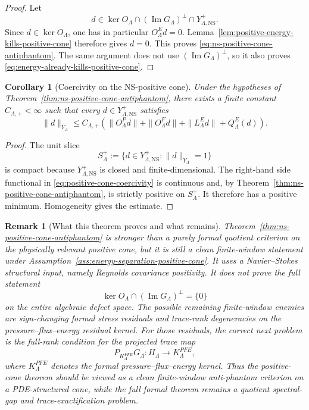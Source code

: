 \documentclass[11pt]{article}
\numberwithin{equation}{section}
\newtheorem{corollary}[theorem]{Corollary}
\newtheorem{remark}[theorem]{Remark}
\newcommand{\NS}{\mathrm{NS}}
\newcommand{\Image}{\operatorname{Im}}
\begin{document}
\begin{proof}
Let
\[
    d\in \ker O_\Lambda
        \cap (\Image G_\Lambda)^\perp
        \cap Y_{\Lambda,\NS}^{+}.
\]
Since \(d\in\ker O_\Lambda\), one has in particular \(O^E_\Lambda d=0\).  Lemma~\ref{lem:positive-energy-kills-positive-cone} therefore gives \(d=0\).  This proves \eqref{eq:ns-positive-cone-antiphantom}.  The same argument does not use \((\Image G_\Lambda)^\perp\), so it also proves \eqref{eq:energy-already-kills-positive-cone}.
\end{proof}

\begin{corollary}[Coercivity on the NS-positive cone]\label{cor:positive-cone-coercivity}
Under the hypotheses of Theorem~\ref{thm:ns-positive-cone-antiphantom}, there exists a finite constant \(C_{\Lambda,+}<\infty\) such that every \(d\in Y_{\Lambda,\NS}^{+}\) satisfies
\begin{equation}\label{eq:positive-cone-coercivity}
    \|d\|_{Y_\Lambda}
    \le
    C_{\Lambda,+}
    \left(
        \|O^P_\Lambda d\|+
        \|O^F_\Lambda d\|+
        \|L^E_\Lambda d\|+
        Q^E_\Lambda(d)
    \right).
\end{equation}
\end{corollary}

\begin{proof}
The unit slice
\[
    S^+_\Lambda:=\{d\in Y_{\Lambda,\NS}^{+}:\|d\|_{Y_\Lambda}=1\}
\]
is compact because \(Y_{\Lambda,\NS}^{+}\) is closed and finite-dimensional.  The right-hand side functional in \eqref{eq:positive-cone-coercivity} is continuous and, by Theorem~\ref{thm:ns-positive-cone-antiphantom}, is strictly positive on \(S^+_\Lambda\).  It therefore has a positive minimum.  Homogeneity gives the estimate.
\end{proof}

\begin{remark}[What this theorem proves and what remains]
Theorem~\ref{thm:ns-positive-cone-antiphantom} is stronger than a purely formal quotient criterion on the physically relevant positive cone, but it is still a clean finite-window statement under Assumption~\ref{ass:energy-separation-positive-cone}.  It uses a Navier--Stokes structural input, namely Reynolds covariance positivity.  It does not prove the full statement
\[
    \ker O_\Lambda\cap(\Image G_\Lambda)^\perp=\{0\}
\]
on the entire algebraic defect space.  The possible remaining finite-window enemies are sign-changing formal stress residuals and trace-rank degeneracies on the pressure--flux--energy residual kernel.  For those residuals, the correct next problem is the full-rank condition for the projected trace map
\[
    P_{K^{PFE}_\Lambda}G_\Lambda:H_\Lambda\to K^{PFE}_\Lambda,
\]
where \(K^{PFE}_\Lambda\) denotes the formal pressure--flux--energy kernel.  Thus the positive-cone theorem should be viewed as a clean finite-window anti-phantom criterion on a PDE-structured cone, while the full formal theorem remains a quotient spectral-gap and trace-exactification problem.
\end{remark}
\end{document}
